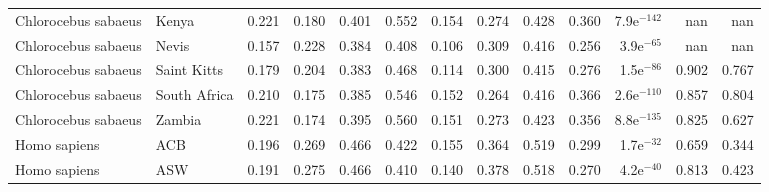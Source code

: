 \begin{longtable}{llrrrrrrrrrrr}
 Chlorocebus sabaeus &                     Kenya &                              0.221 &                               0.180 &                 0.401 &                 0.552 &                              0.154 &                               0.274 &                 0.428 &                 0.360 & 7.9e$^{-142}$ &    nan &    nan \\
 Chlorocebus sabaeus &                     Nevis &                              0.157 &                               0.228 &                 0.384 &                 0.408 &                              0.106 &                               0.309 &                 0.416 &                 0.256 &  3.9e$^{-65}$ &    nan &    nan \\
 Chlorocebus sabaeus &               Saint Kitts &                              0.179 &                               0.204 &                 0.383 &                 0.468 &                              0.114 &                               0.300 &                 0.415 &                 0.276 &  1.5e$^{-86}$ &  0.902 &  0.767 \\
 Chlorocebus sabaeus &              South Africa &                              0.210 &                               0.175 &                 0.385 &                 0.546 &                              0.152 &                               0.264 &                 0.416 &                 0.366 & 2.6e$^{-110}$ &  0.857 &  0.804 \\
 Chlorocebus sabaeus &                    Zambia &                              0.221 &                               0.174 &                 0.395 &                 0.560 &                              0.151 &                               0.273 &                 0.423 &                 0.356 & 8.8e$^{-135}$ &  0.825 &  0.627 \\
        Homo sapiens &                       ACB &                              0.196 &                               0.269 &                 0.466 &                 0.422 &                              0.155 &                               0.364 &                 0.519 &                 0.299 &  1.7e$^{-32}$ &  0.659 &  0.344 \\
        Homo sapiens &                       ASW &                              0.191 &                               0.275 &                 0.466 &                 0.410 &                              0.140 &                               0.378 &                 0.518 &                 0.270 &  4.2e$^{-40}$ &  0.813 &  0.423 \\

\end{longtable}
